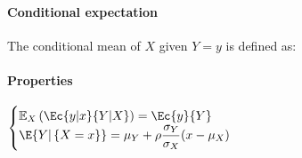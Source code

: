 \paragraph{Conditional expectation}
The conditional mean of $X$ given $Y=y$ is defined as:
\begin{center}
\end{center}

\paragraph{Properties}
\begin{center}
	$\begin{cases}
		\mathbb{E}_{X}\left( \Ec{{y|x}}{{Y|X}} \right)=\Ec{y}{Y}\\
	\E{Y|\left\{ X=x \right\}}=\mu_{Y}+\rho\dfrac{\sigma_{Y}}{\sigma_{X}}(x-\mu_{X})
	\end{cases}$	
\end{center}
